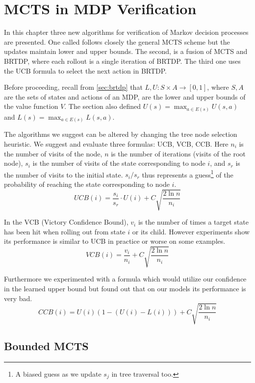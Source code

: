 \chapter{MCTS in MDP Verification}

In this chapter three new algorithms for verification of Markov decision
processes are presented. One called follows
closely the general MCTS scheme but the updates maintain lower and upper
bounds. The second, is a fusion of MCTS and BRTDP, where each
rollout is a single iteration of BRTDP.  The third one
uses the UCB formula to select the next action in BRTDP.

Before proceeding, recall from \autoref{sec:brtdp} that $L,U : S \times
A \to [0,1]$, where $S, A$ are the sets of states and actions of an MDP,
are the lower and upper bounds of the value function $V$.
The section also defined
$U(s) = \max_{a \in E(s)} U(s, a)$
and
$L(s) = \max_{a \in E(s)} L(s, a)$.

The algorithms we suggest can be altered by changing the tree node
selection heuristic. We suggest and evaluate three formulas: UCB, VCB,
CCB.  Here $n_i$ is the number of visits of the node, $n$ is the
number of iterations (visits of the root node), $s_i$ is the number of
visits of the state corresponding to node $i$, and $s_r$ is the number
of visits to the initial state. $s_i/s_r$ thus represents a
guess\footnote{A biased guess as we update $s_j$ in tree traversal too.}
of the probability of reaching the state corresponding to node $i$.
\begin{equation*}
    UCB(i) = \frac{s_i}{s_r} \cdot U(i) + C \sqrt{ \frac{2 \ln n}{n_i} }
\end{equation*}

In the VCB (Victory Confidence Bound), $v_i$ is the number of times a
target state has been hit when rolling out from state $i$ or its child.
However experiments show its performance is similar to UCB in
practice or worse on some examples.
\[
    VCB(i) = \frac{v_i}{n_i} + C \sqrt{ \frac{2 \ln n}{n_i} }
\]

Furthermore we experimented with a formula which would utilize our
confidence in the learned upper bound but found out that on our models
its performance is very bad.
\[
    CCB(i) = U(i) (1 - (U(i) - L(i))) + C \sqrt{ \frac{2 \ln n}{n_i} }
\]

\pagebreak

\section{Bounded MCTS}

